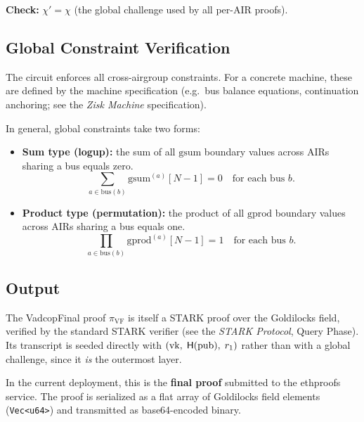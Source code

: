 \textbf{Check:} $\chi' = \chi$ (the global challenge used by all per-AIR proofs).

\subsection{Global Constraint Verification}
\label{sec:vf-global}

The circuit enforces all cross-airgroup constraints.
For a concrete machine, these are defined by the machine specification
(e.g.\ bus balance equations, continuation anchoring;
see the \emph{Zisk Machine} specification).

In general, global constraints take two forms:

\begin{itemize}[nosep]
  \item \textbf{Sum type (logup):}
        the sum of all $\mathrm{gsum}$ boundary values across AIRs
        sharing a bus equals zero.
        \[
          \sum_{a \in \mathrm{bus}(b)} \mathrm{gsum}^{(a)}[N-1] = 0
          \quad \text{for each bus } b.
        \]

  \item \textbf{Product type (permutation):}
        the product of all $\mathrm{gprod}$ boundary values across AIRs
        sharing a bus equals one.
        \[
          \prod_{a \in \mathrm{bus}(b)} \mathrm{gprod}^{(a)}[N-1] = 1
          \quad \text{for each bus } b.
        \]
\end{itemize}

\subsection{Output}
\label{sec:vf-output}

The VadcopFinal proof $\pi_{\mathrm{VF}}$ is itself a STARK proof
over the Goldilocks field,
verified by the standard STARK verifier
(see the \emph{STARK Protocol}, Query Phase).
Its transcript is seeded directly with
$(\mathrm{vk},\; \textsf{H}(\mathrm{pub}),\; r_1)$
rather than with a global challenge,
since it \emph{is} the outermost layer.

In the current deployment, this is the \textbf{final proof} submitted to
the ethproofs service.
The proof is serialized as a flat array of Goldilocks field elements
(\texttt{Vec<u64>}) and transmitted as base64-encoded binary.

